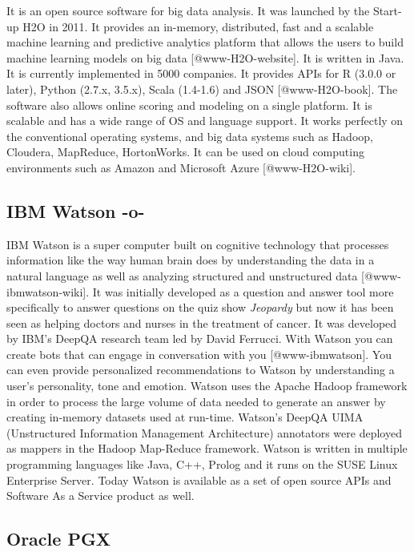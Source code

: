 It is an open source software for big data analysis. It was launched
by the Start-up H2O in 2011. It provides an in-memory, distributed,
fast and a scalable machine learning and predictive analytics platform
that allows the users to build machine learning models on big data
[@www-H2O-website]. It is written in Java. It is currently
implemented in 5000 companies. It provides APIs for R (3.0.0 or
later), Python (2.7.x, 3.5.x), Scala (1.4-1.6) and JSON
[@www-H2O-book]. The software also allows online scoring and
modeling on a single platform.  It is scalable and has a wide range of
OS and language support. It works perfectly on the conventional
operating systems, and big data systems such as Hadoop, Cloudera,
MapReduce, HortonWorks.  It can be used on cloud computing
environments such as Amazon and Microsoft Azure [@www-H2O-wiki].


\subsection{IBM Watson -o-}

IBM Watson is a super computer built on cognitive technology that
processes information like the way human brain does by understanding
the data in a natural language as well as analyzing structured and
unstructured data [@www-ibmwatson-wiki].  It was initially
developed as a question and answer tool more specifically to answer
questions on the quiz show \textit{Jeopardy} but now it has been seen as
helping doctors and nurses in the treatment of cancer. It was
developed by IBM's DeepQA research team led by David Ferrucci. With
Watson you can create bots that can engage in conversation with
you [@www-ibmwatson]. You can even provide personalized
recommendations to Watson by understanding a user's personality, tone
and emotion. Watson uses the Apache Hadoop framework in order to
process the large volume of data needed to generate an answer by
creating in-memory datasets used at run-time. Watson's DeepQA UIMA
(Unstructured Information Management Architecture) annotators were
deployed as mappers in the Hadoop Map-Reduce framework. Watson is
written in multiple programming languages like Java, C++, Prolog and
it runs on the SUSE Linux Enterprise Server. Today Watson is available
as a set of open source APIs and Software As a Service product as
well\cite{www-ibmwatson}.


    
\subsection{Oracle PGX}


